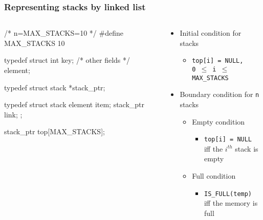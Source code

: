 \documentclass[newPxFont,sthlmFooter,nooffset]{beamer}
\begin{document}
\begin{frame}[t, fragile]
  \frametitle{Representing stacks by linked list}
  \begin{columns}
    \begin{column}{0.5\textwidth}
  \begin{ncodedef}
/* n=MAX_STACKS=10 */ 
#define MAX_STACKS 10

typedef struct {
    int key; 
    /* other fields */ 
} element;

typedef struct stack *stack_ptr; 

typedef struct stack {
    element item;
    stack_ptr link; 
};

stack_ptr top[MAX_STACKS];    
  \end{ncodedef}      
    \end{column}
    \begin{column}{0.5\textwidth}
      \begin{itemize}
      \item Initial condition for stacks
        \begin{itemize}
        \item \texttt{top[i] = NULL, \\0 $\leq$ i $\leq$ MAX\_STACKS}
        \end{itemize}
      \item Boundary condition for \texttt{n} stacks
        \begin{itemize}
        \item Empty condition
          \begin{itemize}
          \item \texttt{top[i] = NULL} \\iff the $i^{th}$ stack is empty
          \end{itemize}

        \item Full condition
          \begin{itemize}
          \item \texttt{IS\_FULL(temp)} \\iff the memory is full
          \end{itemize}

        \end{itemize}

      \end{itemize}
    \end{column}
  \end{columns}

\end{frame}
\end{document}
